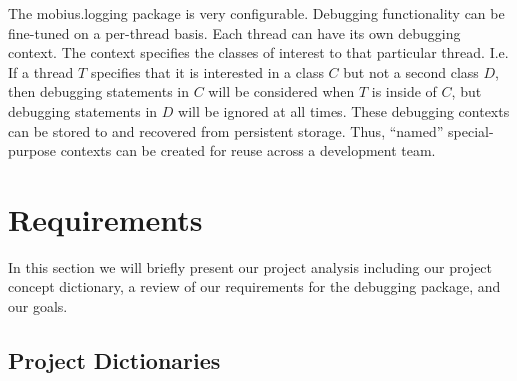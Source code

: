 \documentclass{article}
\begin{document}
The mobius.logging package is very configurable.  Debugging functionality can
be fine-tuned on a per-thread basis.  Each thread can have its own
debugging context.  The context specifies the classes of interest to
that particular thread.  I.e. If a thread $T$ specifies that it is
interested in a class $C$ but not a second class $D$, then debugging
statements in $C$ will be considered when $T$ is inside of $C$, but
debugging statements in $D$ will be ignored at all times.  These
debugging contexts can be stored to and recovered from persistent
storage.  Thus, ``named'' special-purpose contexts can be created for
reuse across a development team.

\section{Requirements}

In this section we will briefly present our project analysis including
our project concept dictionary, a review of our requirements for the
debugging package, and our goals.

\subsection{Project Dictionaries}
\end{document}
